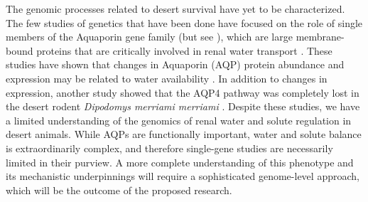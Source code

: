 \documentclass[12pt]{article}
\begin{document}
The genomic processes related to desert survival have yet to be characterized. The few studies of genetics that have been done have focused on the role of single members of the Aquaporin gene family (but see \cite{Bartolo:2007hy}), which are large membrane-bound proteins that are critically involved in renal water transport \citep{Kwon:2009bv,Verkman:2002ww,Brown:1995vo,Nielsen:1995cb}. These studies have shown that changes in Aquaporin (AQP) protein abundance and expression may be related to water availability \citep{Boselt:2009fb, Gallardo:2005fm,Bozinovic:2003eg}. In addition to changes in expression, another study showed that the AQP4 pathway was completely lost in the desert rodent \textit{Dipodomys merriami merriami} \citep{Huang:2001ti}. Despite these studies, we have a limited understanding of the genomics of renal water and solute regulation in desert animals. While AQPs are functionally important, water and solute balance is extraordinarily complex, and therefore single-gene studies are necessarily limited in their purview. A more complete understanding of this phenotype and its mechanistic underpinnings will require a sophisticated genome-level approach, which will be the outcome of the proposed research. \\
\end{document}

